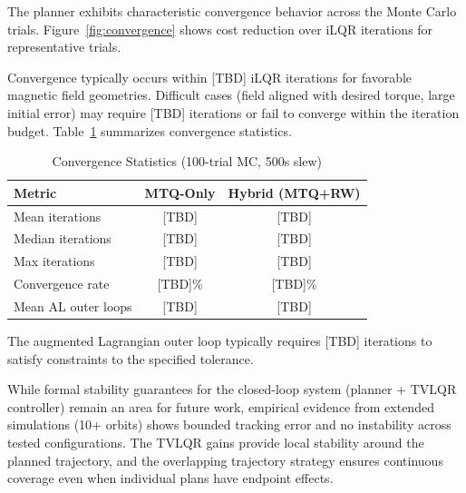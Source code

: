 \documentclass[conference]{IEEEtran}
\begin{document}
The planner exhibits characteristic convergence behavior across the Monte Carlo trials. Figure~\ref{fig:convergence} shows cost reduction over iLQR iterations for representative trials.


Convergence typically occurs within [TBD] iLQR iterations for favorable magnetic field geometries. Difficult cases (field aligned with desired torque, large initial error) may require [TBD] iterations or fail to converge within the iteration budget. Table~\ref{tab:convergence_stats} summarizes convergence statistics.

\begin{table}[t]
    \centering
    \caption{Convergence Statistics (100-trial MC, 500s slew)}
    \label{tab:convergence_stats}
    \begin{tabular}{lcc}
        \toprule
        Metric & MTQ-Only & Hybrid (MTQ+RW) \\
        \midrule
        Mean iterations & [TBD] & [TBD] \\
        Median iterations & [TBD] & [TBD] \\
        Max iterations & [TBD] & [TBD] \\
        Convergence rate & [TBD]\% & [TBD]\% \\
        Mean AL outer loops & [TBD] & [TBD] \\
        \bottomrule
    \end{tabular}
\end{table}

The augmented Lagrangian outer loop typically requires [TBD] iterations to satisfy constraints to the specified tolerance. %

While formal stability guarantees for the closed-loop system (planner + TVLQR controller) remain an area for future work, empirical evidence from extended simulations (10+ orbits) shows bounded tracking error and no instability across tested configurations. The TVLQR gains provide local stability around the planned trajectory, and the overlapping trajectory strategy ensures continuous coverage even when individual plans have endpoint effects.
\end{document}
